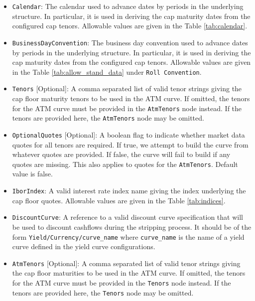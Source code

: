\begin{itemize}
\item \lstinline!Calendar!:
The calendar used to advance dates by periods in the underlying structure. In particular, it is used in deriving the cap maturity dates from the configured cap tenors. Allowable values are given in the Table \ref{tab:calendar}.

\item \lstinline!BusinessDayConvention!:
The business day convention used to advance dates by periods in the underlying structure. In particular, it is used in deriving the cap maturity dates from the configured cap tenors. Allowable values are given in the Table \ref{tab:allow_stand_data} under \lstinline!Roll Convention!.

\item \lstinline!Tenors! [Optional]:
A comma separated list of valid tenor strings giving the cap floor maturity tenors to be used in the ATM curve. If omitted, the tenors for the ATM curve must be provided in the \lstinline!AtmTenors! node instead. If the tenors are provided here, the \lstinline!AtmTenors! node may be omitted.

\item \lstinline!OptionalQuotes! [Optional]:
A boolean flag to indicate whether market data quotes for all tenors are required. If true, we attempt to build the curve from whatever quotes are provided. If false, the curve will fail to build if any quotes are missing. This also applies to quotes for the \lstinline!AtmTenors!. Default value is false.

\item \lstinline!IborIndex!:
A valid interest rate index name giving the index underlying the cap floor quotes. Allowable values are given in the Table \ref{tab:indices}.

\item \lstinline!DiscountCurve!:
A reference to a valid discount curve specification that will be used to discount cashflows during the stripping process. It should be of the form \lstinline!Yield/Currency/curve_name! where \lstinline!curve_name! is the name of a yield curve defined in the yield curve configurations.

\item \lstinline!AtmTenors! [Optional]:
A comma separated list of valid tenor strings giving the cap floor maturities to be used in the ATM curve. If omitted, the tenors for the ATM curve must be provided in the \lstinline!Tenors! node instead. If the tenors are provided here, the \lstinline!Tenors! node may be omitted.


\end{itemize}

